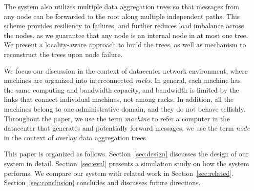 The system also utilizes multiple data aggregation trees so that messages
from any node can be forwarded to the root along multiple independent paths.
This scheme provides resiliency to failures, and further reduces load imbalance
across the nodes, as we guarantee that any node is an internal node in at most
one tree.  We present a locality-aware approach to build the trees, as well as
mechanism to reconstruct the trees upon node failure.

We focus our discussion in the context of datacenter network environment, where
machines are organized into interconnected \emph{racks}.  In general, each
machine has the same computing and bandwidth capacity, and bandwidth is limited
by the links that connect individual machines, not among racks.  In addition,
all the machines belong to one administrative domain, and they do not behave
selfishly.  Throughout the paper, we use the term \emph{machine} to refer a
computer in the datacenter that generates and potentially forward messages; we
use the term \emph{node} in the context of overlay data aggregation trees.

This paper is organized as follows.  Section~\ref{sec:design} discusses the
design of our system in detail.  Section~\ref{sec:eval} presents a simulation
study on how the system performs.  We compare our system with related work in
Section~\ref{sec:related}.  Section~\ref{sec:conclusion} concludes and
discusses future directions.

